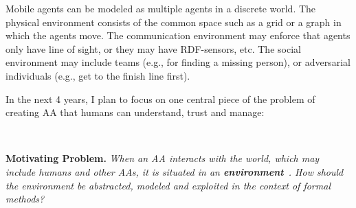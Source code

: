 \documentclass[a4paper,10pt]{article}
\begin{document}
\begin{example}
Mobile agents can be modeled as multiple agents in a discrete world. The physical environment consists of the common space such as a grid or a graph in which the agents move. 
The communication environment may enforce that agents only have line of sight, or they may have RDF-sensors, etc. The social environment may include teams (e.g., for finding a missing person), or adversarial individuals (e.g., get to the finish line first).
\end{example}


 In the next 4 years, I plan to focus on one central piece of the problem of creating AA that humans can understand, trust and manage:
 
\

\noindent\textbf{Motivating Problem.} \emph{
 When an AA interacts with the world, which may include humans and other AAs, it is situated in an \textbf{environment}~\cite{RuNo10}.
 How should the environment be abstracted, modeled and exploited in the context of formal methods?}
 
 
\end{document}
